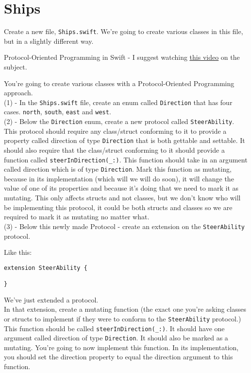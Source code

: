 \documentclass[a4paper,11pt]{scrartcl}
\begin{document}
\section{Ships}

Create a new file, \texttt{Ships.swift}. We're going to create various classes in this file, but in a slightly different way.

Protocol-Oriented Programming in Swift - I suggest watching \href{https://developer.apple.com/videos/play/wwdc2015/408/}{\underline{this video}} on the subject.

You're going to create various classes with a Protocol-Oriented Programming approach.\\

(1) - In the \texttt{Ships.swift} file, create an enum called \texttt{Direction} that has four cases. \texttt{north}, \texttt{south}, \texttt{east} and \texttt{west}.\\

(2) - Below the \texttt{Direction} enum, create a new protocol called \texttt{SteerAbility}. This protocol should require any class/struct conforming to it to provide a property called direction of type \texttt{Direction} that is both gettable and settable. It should also require that the class/struct conforming to it should provide a function called \texttt{steerInDirection(\_:)}. This function should take in an argument called direction which is of type \texttt{Direction}. Mark this function as mutating, because in its implementation (which will we will do soon), it will change the value of one of its properties and because it's doing that we need to mark it as mutating. This only affects structs and not classes, but we don't know who will be implementing this protocol, it could be both structs and classes so we are required to mark it as mutating no matter what.\\

(3) - Below this newly made Protocol - create an extension on the \texttt{SteerAbility} protocol.

Like this:

\begin{lstlisting}
extension SteerAbility {
    
}
\end{lstlisting}

We've just extended a protocol.\\

In that extension, create a mutating function (the exact one you're asking classes or structs to implement if they were to conform to the \texttt{SteerAbility} protocol.) This function should be called \texttt{steerInDirection(\_:)}. It should have one argument called direction of type \texttt{Direction}. It should also be marked as a mutating. You're going to now implement this function. In its implementation, you should set the direction property to equal the direction argument to this function.
\end{document}
